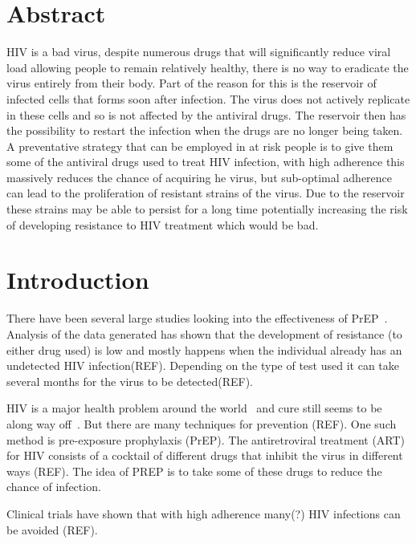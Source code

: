 \documentclass[DIV=15]{scrartcl}
\begin{document}
\section*{Abstract}
HIV is a bad  virus, despite numerous drugs that will significantly reduce viral load allowing people to remain relatively healthy, there is no way to eradicate the virus entirely from their body. Part of the reason for this is the reservoir of  infected cells that forms soon after infection. The virus does not actively replicate in these cells and so is not affected by the antiviral drugs. The reservoir then has the possibility to restart the infection when the drugs are no longer being taken. A preventative strategy that can be employed in at risk people is to give them some of the antiviral drugs used to treat HIV infection, with high adherence this massively reduces the chance of acquiring he virus, but sub-optimal adherence can lead to the proliferation  of resistant strains of the virus. Due to the reservoir these strains may be able to persist for a long time potentially increasing the risk of developing resistance  to HIV treatment which would be bad.

\section{Introduction}
\label{intro}




There have been several large studies looking into the effectiveness of PrEP~\cite{iprex2011,partners2012}. Analysis of the data  generated has shown that the development of resistance (to either drug used) is low and mostly happens when the individual already has an undetected HIV infection(REF). Depending on the type of test used  it can take several months for the virus to be detected(REF). 




HIV is a major health problem around  the world~\cite{unaids} and cure still seems to be along way off~\cite{passaes2014}. But there are many techniques for prevention (REF). One such method is pre-exposure prophylaxis (PrEP). The antiretroviral treatment (ART) for HIV consists of a cocktail of different drugs that inhibit the virus in different ways (REF). The idea of PREP is to take some of these drugs to reduce the chance of infection. 

Clinical trials have shown that with high adherence many(?) HIV infections can be avoided (REF). 
\end{document}
